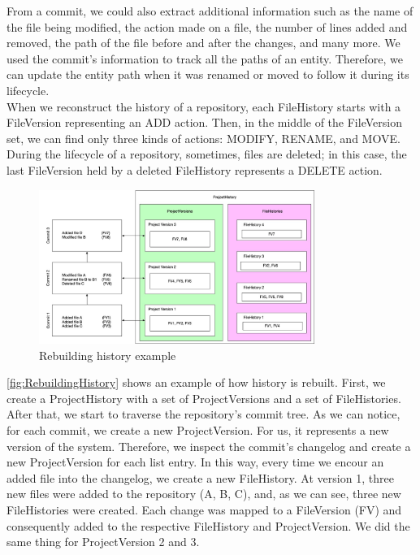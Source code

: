From a commit, we could also extract additional information such as the name of the file being modified, the action made on a file, the number of lines added and removed, the path of the file before and after the changes, and many more.
We used the commit's information to track all the paths of an entity. Therefore, we can update the entity path when it was renamed or moved to follow it during its lifecycle. \\
When we reconstruct the history of a repository, each FileHistory starts with a FileVersion representing an ADD action. Then, in the middle of the FileVersion set, we can find only three kinds of actions: MODIFY, RENAME, and MOVE. 
During the lifecycle of a repository, sometimes, files are deleted; in this case, the last FileVersion held by a deleted FileHistory represents a DELETE action.
\bigbreak


\begin{figure}
    \begin{center}
        \includegraphics[width=0.8\textwidth]{RebuildingHistory.jpg}
    \end{center}
    \caption{Rebuilding history example}
    \label{fig:RebuildingHistory}
\end{figure}

\autoref{fig:RebuildingHistory} shows an example of how history is rebuilt.
First, we create a ProjectHistory with a set of ProjectVersions and a set of FileHistories.
After that, we start to traverse the repository's commit tree.
As we can notice, for each commit, we create a new ProjectVersion. For us, it represents a new version of the system. 
Therefore, we inspect the commit's changelog and create a new ProjectVersion for each list entry.
In this way, every time we encour an added file into the changelog, we create a new FileHistory. 
At version 1, three new files were added to the repository (A, B, C), and, as we can see, three new FileHistories were created.
Each change was mapped to a FileVersion (FV) and consequently added to the respective FileHistory and ProjectVersion. 
We did the same thing for ProjectVersion 2 and 3. 

